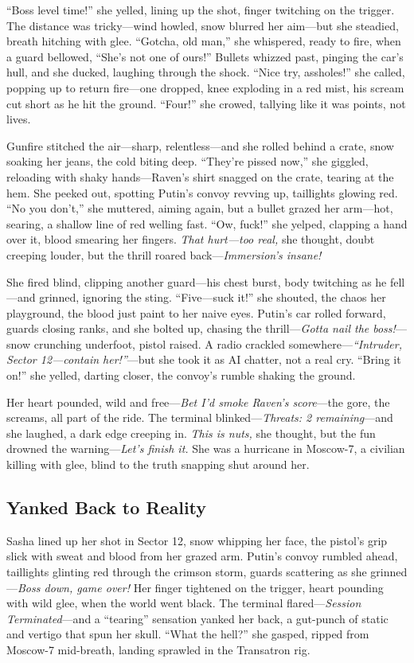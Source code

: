 \documentclass[12pt]{book}
\begin{document}
“Boss level time!” she yelled, lining up the shot, finger twitching on the trigger. The distance was tricky—wind howled, snow blurred her aim—but she steadied, breath hitching with glee. “Gotcha, old man,” she whispered, ready to fire, when a guard bellowed, “She’s not one of ours!” Bullets whizzed past, pinging the car’s hull, and she ducked, laughing through the shock. “Nice try, assholes!” she called, popping up to return fire—one dropped, knee exploding in a red mist, his scream cut short as he hit the ground. “Four!” she crowed, tallying like it was points, not lives.

Gunfire stitched the air—sharp, relentless—and she rolled behind a crate, snow soaking her jeans, the cold biting deep. “They’re pissed now,” she giggled, reloading with shaky hands—Raven’s shirt snagged on the crate, tearing at the hem. She peeked out, spotting Putin’s convoy revving up, taillights glowing red. “No you don’t,” she muttered, aiming again, but a bullet grazed her arm—hot, searing, a shallow line of red welling fast. “Ow, fuck!” she yelped, clapping a hand over it, blood smearing her fingers. \textit{That hurt—too real,} she thought, doubt creeping louder, but the thrill roared back—\textit{Immersion’s insane!}

She fired blind, clipping another guard—his chest burst, body twitching as he fell—and grinned, ignoring the sting. “Five—suck it!” she shouted, the chaos her playground, the blood just paint to her naive eyes. Putin’s car rolled forward, guards closing ranks, and she bolted up, chasing the thrill—\textit{Gotta nail the boss!}—snow crunching underfoot, pistol raised. A radio crackled somewhere—\textit{“Intruder, Sector 12—contain her!”}—but she took it as AI chatter, not a real cry. “Bring it on!” she yelled, darting closer, the convoy’s rumble shaking the ground.

Her heart pounded, wild and free—\textit{Bet I’d smoke Raven’s score}—the gore, the screams, all part of the ride. The terminal blinked—\textit{Threats: 2 remaining}—and she laughed, a dark edge creeping in. \textit{This is nuts,} she thought, but the fun drowned the warning—\textit{Let’s finish it.} She was a hurricane in Moscow-7, a civilian killing with glee, blind to the truth snapping shut around her.

\subsection{Yanked Back to Reality}

Sasha lined up her shot in Sector 12, snow whipping her face, the pistol’s grip slick with sweat and blood from her grazed arm. Putin’s convoy rumbled ahead, taillights glinting red through the crimson storm, guards scattering as she grinned—\textit{Boss down, game over!} Her finger tightened on the trigger, heart pounding with wild glee, when the world went black. The terminal flared—\textit{Session Terminated}—and a “tearing” sensation yanked her back, a gut-punch of static and vertigo that spun her skull. “What the hell?” she gasped, ripped from Moscow-7 mid-breath, landing sprawled in the Transatron rig.
\end{document}
